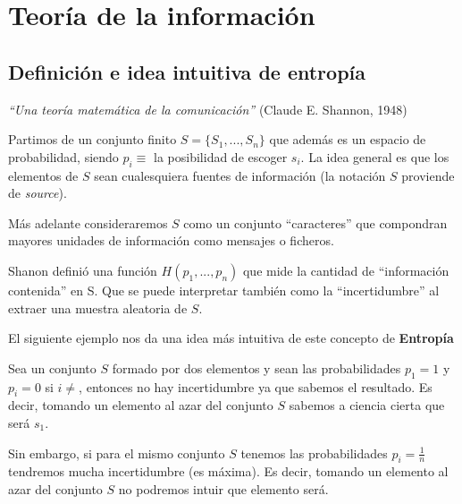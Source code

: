 \chapter{Teoría de la información}


\section{Definición e idea intuitiva de entropía}

	\textit{``Una teoría matemática de la comunicación''} (Claude E. Shannon, 1948)

	Partimos de un conjunto finito $S = \{ S_1, ... , S_n \}$ que además es un espacio de probabilidad, siendo $p_i \equiv$ la posibilidad de escoger $s_i$.
	La idea general es que los elementos de $S$ sean cualesquiera fuentes de información (la notación $S$ proviende de \textit{source}).

	Más adelante consideraremos $S$ como un conjunto ``caracteres'' que compondran mayores unidades de información como mensajes o ficheros.

	\begin{defn}[Entropía]
		Shanon definió una función $ H(p_1, ..., p_n)$ que mide la cantidad de ``información contenida'' en S. Que se puede interpretar también como la ``incertidumbre'' al extraer una muestra aleatoria de $S$.
	\end{defn}

	El siguiente ejemplo nos da una idea más intuitiva de este concepto de \textbf{Entropía}

	\begin{example}
		Sea un conjunto $S$ formado por dos elementos y sean las probabilidades $p_1 = 1$ y $p_i = 0$ si $i \neq $, entonces no hay incertidumbre ya que sabemos el resultado. Es decir, tomando un elemento al azar del conjunto $S$ sabemos a ciencia cierta que será $s_1$.

		Sin embargo, si para el mismo conjunto $S$ tenemos las probabilidades $p_i = \frac{1}{n}$ tendremos mucha incertidumbre (es máxima). Es decir, tomando un elemento al azar del conjunto $S$ no podremos intuir que elemento será.
	\end{example}



